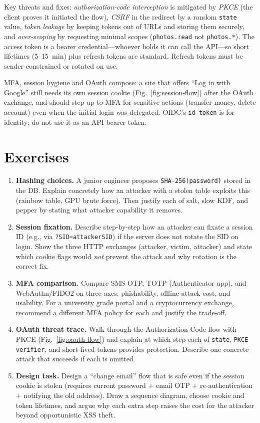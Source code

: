 Key threats and fixes: \emph{authorization-code interception} is mitigated by \emph{PKCE} (the client proves it initiated the flow), \emph{CSRF} in the redirect by a random \texttt{state} value, \emph{token leakage} by keeping tokens out of URLs and storing them securely, and \emph{over-scoping} by requesting minimal scopes (\texttt{photos.read} not \texttt{photos.*}). The access token is a bearer credential---whoever holds it can call the API---so short lifetimes ($5$--$15$~min) plus refresh tokens are standard. Refresh tokens must be sender-constrained or rotated on use.

MFA, session hygiene and OAuth compose: a site that offers ``Log in with Google'' still needs its own session cookie (Fig.~\ref{fig:session-flow}) after the OAuth exchange, and should step up to MFA for sensitive actions (transfer money, delete account) even when the initial login was delegated. OIDC's \texttt{id\_token} is for identity; do not use it as an API bearer token.

\section{Exercises}\label{sec:ch02-exercises}
\begin{enumerate}[label=E2.\arabic*, leftmargin=*, itemsep=0.6em]
    \item \textbf{Hashing choices.} A junior engineer proposes \texttt{SHA-256(password)} stored in the DB. Explain concretely how an attacker with a stolen table exploits this (rainbow table, GPU brute force). Then justify each of salt, slow KDF, and pepper by stating what attacker capability it removes.
    \item \textbf{Session fixation.} Describe step-by-step how an attacker can fixate a session ID (e.g., via \texttt{?SID=attackerSID}) if the server does not rotate the SID on login. Show the three HTTP exchanges (attacker, victim, attacker) and state which cookie flags would \emph{not} prevent the attack and why rotation is the correct fix.
    \item \textbf{MFA comparison.} Compare SMS OTP, TOTP (Authenticator app), and WebAuthn/FIDO2 on three axes: phishability, offline attack cost, and usability. For a university grade portal and a cryptocurrency exchange, recommend a different MFA policy for each and justify the trade-off.
    \item \textbf{OAuth threat trace.} Walk through the Authorization Code flow with PKCE (Fig.~\ref{fig:oauth-flow}) and explain at which step each of \texttt{state}, \texttt{PKCE verifier}, and short-lived tokens provides protection. Describe one concrete attack that succeeds if each is omitted.
    \item \textbf{Design task.} Design a ``change email'' flow that is safe even if the session cookie is stolen (requires current password + email OTP + re-authentication + notifying the old address). Draw a sequence diagram, choose cookie and token lifetimes, and argue why each extra step raises the cost for the attacker beyond opportunistic XSS theft.
\end{enumerate}

